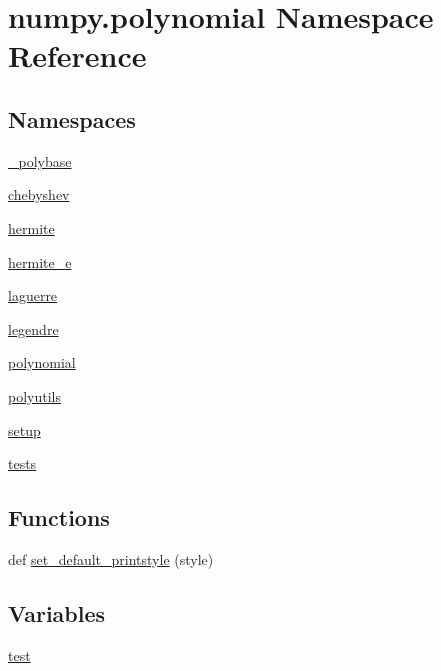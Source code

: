\hypertarget{namespacenumpy_1_1polynomial}{}\section{numpy.\+polynomial Namespace Reference}
\label{namespacenumpy_1_1polynomial}
\subsection*{Namespaces}
\begin{DoxyCompactItemize}
\item 
 \hyperlink{namespacenumpy_1_1polynomial_1_1__polybase}{\+\_\+polybase}
\item 
 \hyperlink{namespacenumpy_1_1polynomial_1_1chebyshev}{chebyshev}
\item 
 \hyperlink{namespacenumpy_1_1polynomial_1_1hermite}{hermite}
\item 
 \hyperlink{namespacenumpy_1_1polynomial_1_1hermite__e}{hermite\+\_\+e}
\item 
 \hyperlink{namespacenumpy_1_1polynomial_1_1laguerre}{laguerre}
\item 
 \hyperlink{namespacenumpy_1_1polynomial_1_1legendre}{legendre}
\item 
 \hyperlink{namespacenumpy_1_1polynomial_1_1polynomial}{polynomial}
\item 
 \hyperlink{namespacenumpy_1_1polynomial_1_1polyutils}{polyutils}
\item 
 \hyperlink{namespacenumpy_1_1polynomial_1_1setup}{setup}
\item 
 \hyperlink{namespacenumpy_1_1polynomial_1_1tests}{tests}
\end{DoxyCompactItemize}
\subsection*{Functions}
\begin{DoxyCompactItemize}
\item 
def \hyperlink{namespacenumpy_1_1polynomial_a72683cf4fec4df5aaca959cdbab278a0}{set\+\_\+default\+\_\+printstyle} (style)
\end{DoxyCompactItemize}
\subsection*{Variables}
\begin{DoxyCompactItemize}
\item 
\hyperlink{namespacenumpy_1_1polynomial_ab69cac4b8a52e2993a7792c06ba62e77}{test}
\end{DoxyCompactItemize}


